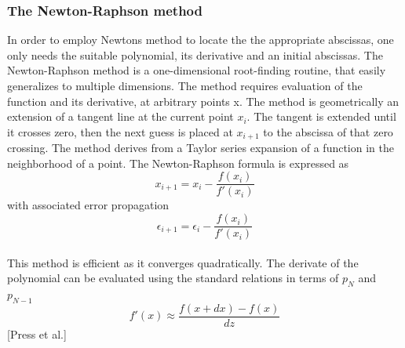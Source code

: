 \documentclass[%
reprint,
amsmath,amssymb,
aps,
]{revtex4-1}
\begin{document}
\subsubsection{The Newton-Raphson method} \noindent 
In order to employ Newtons method to locate the the appropriate abscissas, one only needs the suitable polynomial, its derivative and an initial abscissas.  The Newton-Raphson method is a one-dimensional root-finding routine, that easily generalizes to multiple dimensions. The method requires evaluation of the function and its derivative, at arbitrary points x. The method is geometrically an extension of a tangent line at the current point $x_i$. The tangent is extended until it crosses zero, then the next guess is placed at $x_{i+1}$ to the abscissa of that zero crossing. The method derives from a Taylor series expansion of a function in the neighborhood of a point. The Newton-Raphson formula is expressed as \vspace{2mm} \\
\begin{equation*}
	x_{i+1} = x_i -\dfrac{f(x_i)}{f'(x_i)}
\end{equation*}
with associated error propagation\vspace{2mm} \\
\begin{equation}\label{newton}
	\epsilon_{i+1} = \epsilon_i  -\dfrac{f(x_i)}{f'(x_i)}
\end{equation}\vspace{2mm} \\
This method is efficient as it converges quadratically. The derivate of the polynomial can be evaluated using the standard relations in terms of $p_N$ and $p_{N-1}$ \vspace{2mm} \\
\begin{equation*}
	f'(x) \approx \dfrac{f(x+dx)- f(x)}{dz}
\end{equation*}\vspace{2mm} 
 \hspace{65mm} [Press et al.]
\end{document}
